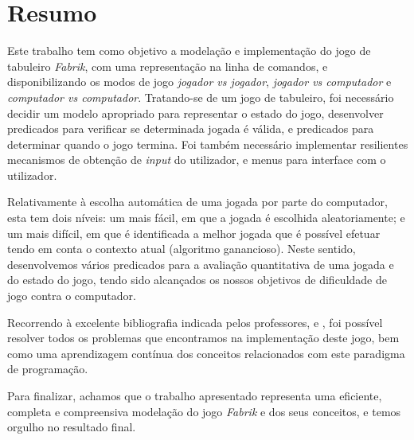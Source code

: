 \documentclass[a4paper]{article}
\begin{document}

\newpage

\section*{Resumo}

Este trabalho tem como objetivo a modelação e implementação do jogo de tabuleiro \textit{Fabrik}, com uma representação na linha de comandos, e disponibilizando os modos de jogo \textit{jogador vs jogador}, \textit{jogador vs computador} e \textit{computador vs computador}. Tratando-se de um jogo de tabuleiro, foi necessário decidir um modelo apropriado para representar o estado do jogo, desenvolver predicados para verificar se determinada jogada é válida, e predicados para determinar quando o jogo termina. Foi também necessário implementar resilientes mecanismos de obtenção de \textit{input} do utilizador, e menus para interface com o utilizador.

Relativamente à escolha automática de uma jogada por parte do computador, esta tem dois níveis: um mais fácil, em que a jogada é escolhida aleatoriamente; e um mais difícil, em que é identificada a melhor jogada que é possível efetuar tendo em conta o contexto atual (algoritmo ganancioso). Neste sentido, desenvolvemos vários predicados para a avaliação quantitativa de uma jogada e do estado do jogo, tendo sido alcançados os nossos objetivos de dificuldade de jogo contra o computador.

Recorrendo à excelente bibliografia indicada pelos professores, \cite{sterling_shapiro_warren_2010} e \cite{carlsson_fruhwirth_2016}, foi possível resolver todos os problemas que encontramos na implementação deste jogo, bem como uma aprendizagem contínua dos conceitos relacionados com este paradigma de programação.

Para finalizar, achamos que o trabalho apresentado representa uma eficiente, completa e compreensiva modelação do jogo \textit{Fabrik} e dos seus conceitos, e temos orgulho no resultado final.

\newpage

\tableofcontents

\end{document}
